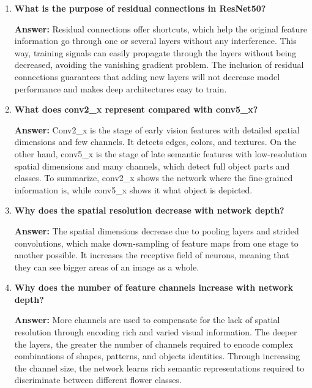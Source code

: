 \documentclass[10pt]{article}
\begin{document}
\begin{enumerate}

\item \textbf{What is the purpose of residual connections in ResNet50?}

\textbf{Answer:} Residual connections offer shortcuts, which help the original feature information go through one or several layers without any interference. This way, training signals can easily propagate through the layers without being decreased, avoiding the vanishing gradient problem. The inclusion of residual connections guarantees that adding new layers will not decrease model performance and makes deep architectures easy to train.

\vspace{5mm}

\item \textbf{What does conv2\_x represent compared with conv5\_x?}

\textbf{Answer:} Conv2\_x is the stage of early vision features with detailed spatial dimensions and few channels. It detects edges, colors, and textures. On the other hand, conv5\_x is the stage of late semantic features with low-resolution spatial dimensions and many channels, which detect full object parts and classes. To summarize, conv2\_x shows the network where the fine-grained information is, while conv5\_x shows it what object is depicted.

\vspace{5mm}

\item \textbf{Why does the spatial resolution decrease with network depth?}

\textbf{Answer:} The spatial dimensions decrease due to pooling layers and strided convolutions, which make down-sampling of feature maps from one stage to another possible. It increases the receptive field of neurons, meaning that they can see bigger areas of an image as a whole.

\vspace{5mm}

\item \textbf{Why does the number of feature channels increase with network depth?}

\textbf{Answer:} More channels are used to compensate for the lack of spatial resolution through encoding rich and varied visual information. The deeper the layers, the greater the number of channels required to encode complex combinations of shapes, patterns, and objects identities. Through increasing the channel size, the network learns rich semantic representations required to discriminate between different flower classes.


\end{enumerate}
\end{document}
